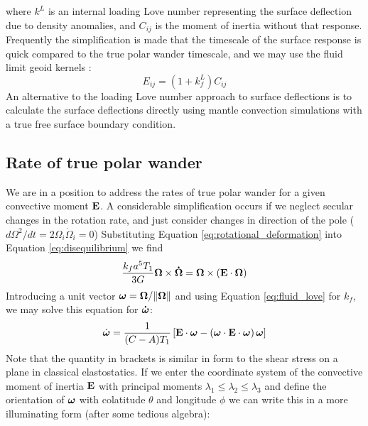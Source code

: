 \documentclass[extra,mreferee]{gji}
\newif\ifdetail
\begin{document}
where $k^L$ is an internal loading Love number representing the surface deflection due to density anomalies, and $C_{ij}$ is the moment of inertia without that response.
Frequently the simplification is made that the timescale of the surface response is quick compared to the true polar wander timescale, and we may use the fluid limit geoid kernels \citep[e.g.][]{richards1984geoid}:  
\begin{equation}
E_{ij} = (1+k^L_f) C_{ij}
\end{equation}
An alternative to the loading Love number approach to surface deflections is to calculate the surface deflections directly using mantle convection simulations with a true free surface boundary condition.

\subsection{Rate of true polar wander}

We are in a position to address the rates of true polar wander for a given convective moment $\bf E$.
A considerable simplification occurs if we neglect secular changes in the rotation rate, and just consider changes in direction of the pole ($d \Omega^2 / dt = 2 {\Omega_i} \dot{ \Omega}_i = 0$)
Substituting Equation \eqref{eq:rotational_deformation} into Equation \eqref{eq:disequilibrium} we find
\begin{equation}
\frac{k_f a^5 T_1}{3G}{\bf \Omega} \times {\bf \dot{\Omega} } = {\bf \Omega} \times \left( {\bf E \cdot \Omega} \right)
\label{eq:liouville}
\end{equation}
Introducing a unit vector $\mitbf{\omega} = {\bf \Omega}/\|{\bf \Omega} \|$ and using Equation \eqref{eq:fluid_love} for $k_f$,  we may solve this equation for ${\bf \dot{\mitbf{\omega}} }$:
\begin{equation}
 \dot{\mitbf{\omega}}  = \frac{1}{(C-A)T_1} \left[ {\bf E \cdot \mitbf{\omega}} - \left( {\bf \mitbf{\omega} \cdot E \cdot \mitbf{\omega} } \right) \mitbf{\omega} \right]
\end{equation}
Note that the quantity in brackets is similar in form to the shear stress on a plane in classical elastostatics.
If we enter the coordinate system of the convective moment of inertia $\bf E$ with principal moments $\lambda_1 \le \lambda_2 \le \lambda_3$ and define the orientation of $\mitbf{\omega}$ with colatitude $\theta$ and longitude $\phi$ we can write this in a more illuminating form (after some tedious algebra):
\ifdetail
\end{document}

